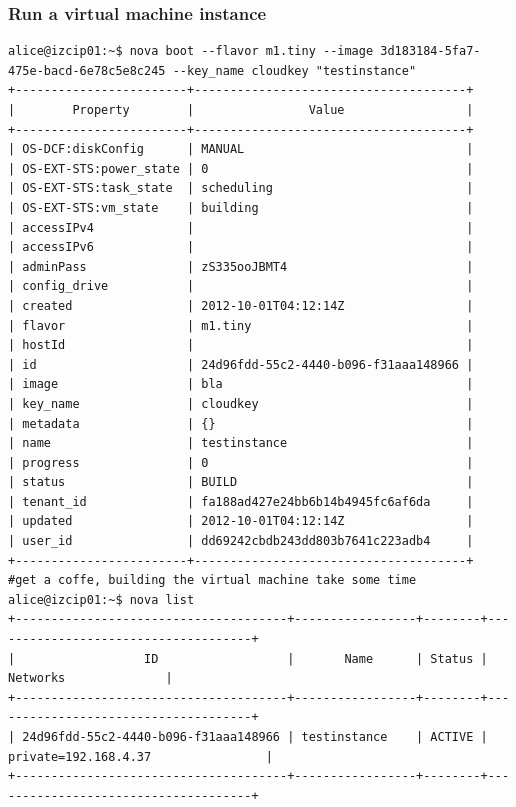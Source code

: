 \documentclass[a4paper,ngerman,bibtotocliststotoc]{scrartcl}
\begin{document}
\subsubsection{Run a virtual machine instance}
\begin{verbatim}
alice@izcip01:~$ nova boot --flavor m1.tiny --image 3d183184-5fa7-475e-bacd-6e78c5e8c245 --key_name cloudkey "testinstance"
+------------------------+--------------------------------------+
|        Property        |                Value                 |
+------------------------+--------------------------------------+
| OS-DCF:diskConfig      | MANUAL                               |
| OS-EXT-STS:power_state | 0                                    |
| OS-EXT-STS:task_state  | scheduling                           |
| OS-EXT-STS:vm_state    | building                             |
| accessIPv4             |                                      |
| accessIPv6             |                                      |
| adminPass              | zS335ooJBMT4                         |
| config_drive           |                                      |
| created                | 2012-10-01T04:12:14Z                 |
| flavor                 | m1.tiny                              |
| hostId                 |                                      |
| id                     | 24d96fdd-55c2-4440-b096-f31aaa148966 |
| image                  | bla                                  |
| key_name               | cloudkey                             |
| metadata               | {}                                   |
| name                   | testinstance                         |
| progress               | 0                                    |
| status                 | BUILD                                |
| tenant_id              | fa188ad427e24bb6b14b4945fc6af6da     |
| updated                | 2012-10-01T04:12:14Z                 |
| user_id                | dd69242cbdb243dd803b7641c223adb4     |
+------------------------+--------------------------------------+
#get a coffe, building the virtual machine take some time
alice@izcip01:~$ nova list
+--------------------------------------+-----------------+--------+-------------------------------------+
|                  ID                  |       Name      | Status |               Networks              |
+--------------------------------------+-----------------+--------+-------------------------------------+
| 24d96fdd-55c2-4440-b096-f31aaa148966 | testinstance    | ACTIVE | private=192.168.4.37                |
+--------------------------------------+-----------------+--------+-------------------------------------+
\end{verbatim}
\end{document}

